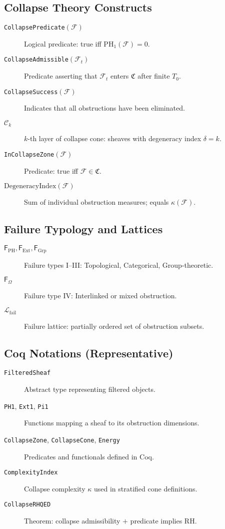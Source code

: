 \documentclass[11pt]{article}
\begin{document}
\subsection*{Collapse Theory Constructs}

\begin{description}
  \item[\texttt{CollapsePredicate}$(\mathcal{F})$] Logical predicate: true iff $\mathrm{PH}_1(\mathcal{F}) = 0$.
  \item[\texttt{CollapseAdmissible}$(\mathcal{F}_t)$] Predicate asserting that $\mathcal{F}_t$ enters $\mathfrak{C}$ after finite $T_0$.
  \item[\texttt{CollapseSuccess}$(\mathcal{F})$] Indicates that all obstructions have been eliminated.
  \item[$\mathcal{C}_k$] $k$-th layer of collapse cone: sheaves with degeneracy index $\delta = k$.
  \item[\texttt{InCollapseZone}$(\mathcal{F})$] Predicate: true iff $\mathcal{F} \in \mathfrak{C}$.
  \item[$\text{DegeneracyIndex}(\mathcal{F})$] Sum of individual obstruction measures; equals $\kappa(\mathcal{F})$.
\end{description}

\subsection*{Failure Typology and Lattices}

\begin{description}
  \item[$\mathsf{F}_\mathrm{PH}, \mathsf{F}_\mathrm{Ext}, \mathsf{F}_\mathrm{Grp}$] Failure types I–III: Topological, Categorical, Group-theoretic.
  \item[$\mathsf{F}_\Omega$] Failure type IV: Interlinked or mixed obstruction.
  \item[$\mathcal{L}_\mathrm{fail}$] Failure lattice: partially ordered set of obstruction subsets.
\end{description}

\subsection*{Coq Notations (Representative)}

\begin{description}
  \item[\texttt{FilteredSheaf}] Abstract type representing filtered objects.
  \item[\texttt{PH1}, \texttt{Ext1}, \texttt{Pi1}] Functions mapping a sheaf to its obstruction dimensions.
  \item[\texttt{CollapseZone}, \texttt{CollapseCone}, \texttt{Energy}] Predicates and functionals defined in Coq.
  \item[\texttt{ComplexityIndex}] Collapse complexity $\kappa$ used in stratified cone definitions.
  \item[\texttt{CollapseRHQED}] Theorem: collapse admissibility $+$ predicate implies RH.
\end{description}
\end{document}
